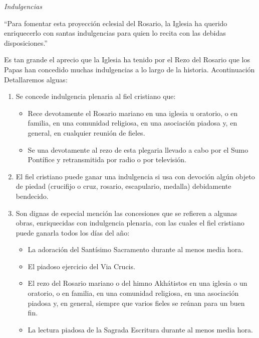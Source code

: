 \documentclass[12pt, letterpaper]{report}
\begin{document}
    \LARGE \textit{Indulgencias}
    
    \Large ``Para fomentar esta proyección eclesial del Rosario, la Iglesia ha querido enriquecerlo con santas indulgencias para quien lo recita con las debidas disposiciones.''\cite{Enciclica}
    
    Es tan grande el aprecio que la Iglesia ha tenido por el Rezo del Rosario que los Papas han concedido muchas indulgencias a lo largo de la historia. Acontinuación Detallaremos alguas:

    \begin{enumerate}
      \item Se concede indulgencia plenaria al fiel cristiano que:
      \begin{itemize}
        \item Rece devotamente el Rosario mariano en una iglesia u oratorio, o en familia, en una comunidad religiosa, en una asociación piadosa y, en general, en cualquier reunión de fieles.\cite{Indulgencias}
        \item Se una devotamente al rezo de esta plegaria llevado a cabo por el Sumo Pontífice y retransmitida por radio o por televisión.\cite{Indulgencias}
      \end{itemize}
      \item El fiel cristiano puede ganar una indulgencia si usa con devoción algún objeto de piedad (crucifijo o cruz, rosario, escapulario, medalla) debidamente bendecido.
      \item Son dignas de especial mención las concesiones que se refieren a algunas obras, enriquecidas con indulgencia plenaria, con las cuales el fiel cristiano puede ganarla todos los días del año:
      \begin{itemize}
        \item La adoración del Santísimo Sacramento durante al menos media hora.\cite{Indulgencias}
        \item El piadoso ejercicio del Via Crucis.\cite{Indulgencias}
        \item El rezo del Rosario mariano o del himno Akhátistos en una iglesia o un oratorio, o en familia, en una comunidad religiosa, en una asociación piadosa y, en general, siempre que varios fieles se reúnan para un buen fin.\cite{Indulgencias}
        \item La lectura piadosa de la Sagrada Escritura durante al menos media hora.\cite{Indulgencias}
      \end{itemize}
    \end{enumerate}
    
\end{document}
